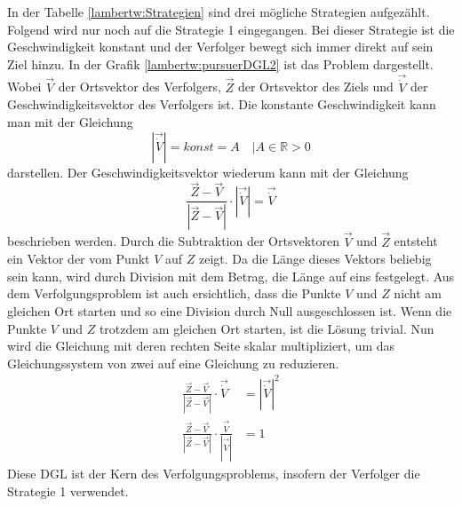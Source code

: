 
In der Tabelle \eqref{lambertw:Strategien} sind drei mögliche Strategien aufgezählt.
Folgend wird nur noch auf die Strategie 1 eingegangen.
Bei dieser Strategie ist die Geschwindigkeit konstant und der Verfolger bewegt sich immer direkt auf sein Ziel hinzu.
In der Grafik \eqref{lambertw:pursuerDGL2} ist das Problem dargestellt.
Wobei $\overrightarrow{V}$ der Ortsvektor des Verfolgers, $\overrightarrow{Z}$ der Ortsvektor des Ziels und $\overrightarrow{\dot{V}}$ der Geschwindigkeitsvektor des Verfolgers ist.
Die konstante Geschwindigkeit kann man mit der Gleichung
\begin{equation}
    |\overrightarrow{\dot{V}}|
    = konst = A
    \quad|A\in\mathbb{R}>0
\end{equation}
darstellen. Der Geschwindigkeitsvektor wiederum kann mit der Gleichung
\begin{equation}
    \frac{\overrightarrow{Z}-\overrightarrow{V}}{|\overrightarrow{Z}-\overrightarrow{V}|}\cdot|\overrightarrow{\dot{V}}|
    =
    \overrightarrow{\dot{V}}
\end{equation}
beschrieben werden.
Durch die Subtraktion der Ortsvektoren $\overrightarrow{V}$ und $\overrightarrow{Z}$ entsteht ein Vektor der vom Punkt $V$ auf $Z$ zeigt.
Da die Länge dieses Vektors beliebig sein kann, wird durch Division mit dem Betrag, die Länge auf eins festgelegt.
Aus dem Verfolgungsproblem ist auch ersichtlich, dass die Punkte $V$ und $Z$ nicht am gleichen Ort starten und so eine Division durch Null ausgeschlossen ist.
Wenn die Punkte $V$ und $Z$ trotzdem am gleichen Ort starten, ist die Lösung trivial.
Nun wird die Gleichung mit deren rechten Seite skalar multipliziert, um das Gleichungssystem von zwei auf eine Gleichung zu reduzieren.
\begin{align}
    \label{pursuer:pursuerDGL}
    \frac{\overrightarrow{Z}-\overrightarrow{V}}{|\overrightarrow{Z}-\overrightarrow{V}|}\cdot
    \overrightarrow{\dot{V}}
    &=
    |\overrightarrow{\dot{V}}|^2
    \\
    \frac{\overrightarrow{Z}-\overrightarrow{V}}{|\overrightarrow{Z}-\overrightarrow{V}|}\cdot \frac{\overrightarrow{\dot{V}}}{|\overrightarrow{\dot{V}}|}
    &=
    1
\end{align}
Diese DGL ist der Kern des Verfolgungsproblems, insofern der Verfolger die Strategie 1 verwendet.



